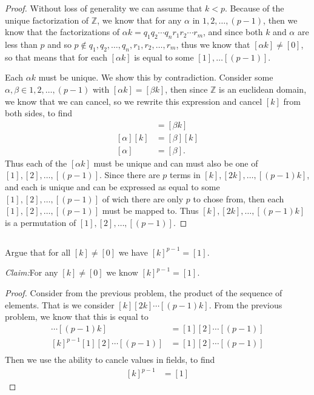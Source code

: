 \documentclass[10pt]{amsart}
\newcommand{\Z}{\mathbb{Z}}
\newenvironment{claim}[1]{\par\noindent\textit{Claim:}\space#1}{}
\begin{document}
\begin{proof}
  Without loss of generality we can assume that $k<p$. Because of the unique
  factorization of $\Z$, we know that for any $\alpha$ in $1,2,\ldots,(p-1)$,
  then we know that the factorizations of $\alpha k=q_1q_2\cdots
  q_n r_1r_2\cdots r_m$, and since both $k$ and $\alpha$ are less than $p$ and
  so $p\notin{q_1,q_2,\ldots,q_n,r_1,r_2,\ldots,r_m}$, thus we know that
  $[\alpha k]\neq [0]$, so that means that for each $[\alpha k]$ is equal to
  some $[1],\ldots[(p-1)]$.

  Each $\alpha k$ must be unique. We show this by contradiction. Consider some
  $\alpha,\beta\in{1,2,\ldots,(p-1)}$ with $[\alpha k]=[\beta k]$, then since
  $\Z$ is an euclidean domain, we know that we can cancel, so we rewrite this
  expression and cancel $[k]$ from both sides, to find
  \begin{align*}
    [\alpha k]&=[\beta k]\\
    [\alpha][k]&=[\beta][k]\\
    [\alpha]&=[\beta].
  \end{align*}
  Thus each of the $[\alpha k]$ must be unique and can must also be one of
  $[1],[2],\ldots,[(p-1)]$. Since there are $p$ terms in
  $[k],[2k],\ldots,[(p-1)k]$, and each is unique and can be expressed as equal
  to some $[1],[2],\ldots,[(p-1)]$ of wich there are only $p$ to chose from,
  then each $[1],[2],\ldots,[(p-1)]$ must be mapped to.  Thus
  $[k],[2k],\ldots,[(p-1)k]$ is a permutation of $[1],[2],\ldots,[(p-1)]$.
\end{proof}

\subsection{}%
\label{sub:3b}

Argue that for all $[k]\neq [0]$ we have ${[k]}^{p-1}=[1]$.

\begin{claim}
  For any $[k]\neq[0]$ we know ${[k]}^{p-1}=[1]$.
\end{claim}
\begin{proof}
  Consider from the previous problem, the product of the sequence of elements.
  That is we consider $[k][2k]\cdots[(p-1)k]$. From the previous problem, we
  know that this is equal to
  \begin{align*}
    [k][2k]\cdots[(p-1)k]&=[1][2]\cdots[(p-1)]\\
    {[k]}^{p-1}[1][2]\cdots[(p-1)]&=[1][2]\cdots[(p-1)]\\
  \end{align*}
  Then we use the ability to cancle values in fields, to find
  \begin{align*}
    {[k]}^{p-1}&=[1]
  \end{align*}
\end{proof}
\end{document}
